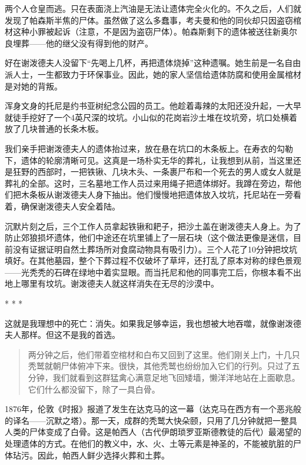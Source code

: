 \documentclass[12pt,oneside]{book}
\begin{document}
\begin{bookref}[frametitle={\cite{好好告别}}]
两个人仓皇而逃。只在表面浇上汽油是无法让遗体完全火化的。不久之后，人们就发现了帕森斯半焦的尸体。虽然做了这么多蠢事，考夫曼和他的同伙却只因盗窃棺材这种小罪被起诉（注意，不是因为盗窃尸体）。帕森斯剩下的遗体被送往新奥尔良埋葬——他的继父没有得到他的财产。

好在谢泼德夫人没留下“先喝上几杯，再把遗体烧掉”这种遗嘱。她生前是一名自由派人士，一生都致力于环保事业。因此，她的家人坚信给遗体防腐和使用金属棺材是对她的背叛。

浑身文身的托尼是约书亚树纪念公园的员工。他趁着毒辣的太阳还没升起，一大早就徒手挖好了一个4英尺深的坟坑。小山似的花岗岩沙土堆在坟坑旁，坑口处横着放了几块普通的长条木板。

我们亲手把谢泼德夫人的遗体抬过来，放在悬在坑口的木条板上。在寿衣的勾勒下，遗体的轮廓清晰可见。这真是一场朴实无华的葬礼，让我想到从前，当这里还是狂野的西部时，一把铁锹、几块木头、一条裹尸布和一个死去的男人或女人就是葬礼的全部。这时，三名墓地工作人员过来用绳子把遗体绑好。我蹲在旁边，帮他们把木条板从谢泼德夫人身下抽出。他们慢慢地把遗体放入坟坑，托尼站在一旁看着，确保谢泼德夫人安全着陆。

沉默片刻之后，三个工作人员拿起铁锹和耙子，把沙土盖在谢泼德夫人身上。为了防止郊狼损坏遗体，他们中途还在坑里铺上了一层石块（这个做法更像是迷信，目前没有证据证明自然土葬场所对食腐动物具有吸引力）。三个人花了10分钟把坟坑填好。在其他墓园，整个下葬过程不仅破坏了草坪，还打乱了原本对称的绿色景观——光秃秃的石碑在绿地中着实显眼。而当托尼和他的同事完工后，你根本看不出地上哪里有坟坑。谢泼德夫人就这样消失在无尽的沙漠中。

\begin{center}
* * *
\end{center}

这就是我理想中的死亡：消失。如果我足够幸运，我也想被大地吞噬，就像谢泼德夫人那样。但这不是我的首选。

\begin{quotation}
两分钟之后，他们带着空棺材和白布又回到了这里。他们刚关上门，十几只秃鹫就朝尸体俯冲下来。很快，其他秃鹫也纷纷加入它们的行列。只过了五分钟，我们就看到这群猛禽心满意足地飞回矮墙，懒洋洋地站在上面歇息。它们什么都没留下，除了一具白骨。
\end{quotation}

1876年，伦敦《时报》报道了发生在达克马的这一幕（达克马在西方有一个恶兆般的译名——沉默之塔）。那一天，成群的秃鹫大快朵颐，只用了几分钟就把一整具人类的尸体变成了白骨。这是帕西人（古代伊朗琐罗亚斯德教徒的后代）最渴望的处理遗体的方式。在他们的教义中，水、火、土等元素是神圣的，不能被肮脏的尸体玷污。因此，帕西人鲜少选择火葬和土葬。


\end{bookref}
\end{document}
